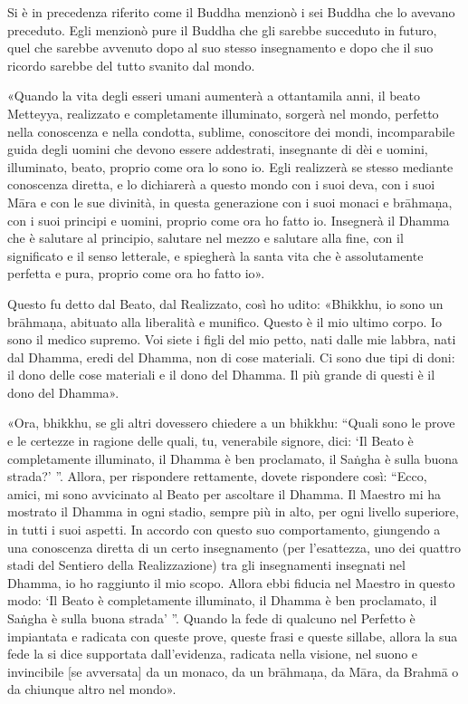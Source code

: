  Si è in precedenza riferito come il Buddha menzionò i
sei Buddha che lo avevano preceduto. Egli menzionò pure il Buddha che
gli sarebbe succeduto in futuro, quel che sarebbe avvenuto dopo al suo
stesso insegnamento e dopo che il suo ricordo sarebbe del tutto svanito
dal mondo.


 «Quando la vita degli esseri umani aumenterà a ottantamila
anni, il beato Metteyya, realizzato e completamente illuminato, sorgerà
nel mondo, perfetto nella conoscenza e nella condotta, sublime,
conoscitore dei mondi, incomparabile guida degli uomini che devono
essere addestrati, insegnante di dèi e uomini, illuminato, beato,
proprio come ora lo sono io. Egli realizzerà se stesso mediante
conoscenza diretta, e lo dichiarerà a questo mondo con i suoi deva, con
i suoi Māra e con le sue divinità, in questa generazione con i suoi
monaci e brāhmaṇa, con i suoi principi e uomini, proprio come ora ho
fatto io. Insegnerà il Dhamma che è salutare al principio, salutare nel
mezzo e salutare alla fine, con il significato e il senso letterale, e
spiegherà la santa vita che è assolutamente perfetta e pura, proprio
come ora ho fatto io».




Questo fu detto dal Beato, dal Realizzato, così ho udito: «Bhikkhu, io
sono un brāhmaṇa, abituato alla liberalità e munifico. Questo è il mio
ultimo corpo. Io sono il medico supremo. Voi siete i figli del mio
petto, nati dalle mie labbra, nati dal Dhamma, eredi del Dhamma, non di
cose materiali. Ci sono due tipi di doni: il dono delle cose materiali e
il dono del Dhamma. Il più grande di questi è il dono del Dhamma».




\label{pag222}«Ora, bhikkhu, se gli altri dovessero chiedere a un bhikkhu: “Quali sono
le prove e le certezze in ragione delle quali, tu, venerabile signore,
dici: ‘Il Beato è completamente illuminato, il Dhamma è ben proclamato,
il Saṅgha è sulla buona strada?’ ”. Allora, per rispondere rettamente,
dovete rispondere così: “Ecco, amici, mi sono avvicinato al Beato per
ascoltare il Dhamma. Il Maestro mi ha mostrato il Dhamma in ogni stadio,
sempre più in alto, per ogni livello superiore, in tutti i suoi aspetti.
In accordo con questo suo comportamento, giungendo a una conoscenza
diretta di un certo insegnamento (per l’esattezza, uno dei quattro stadi
del Sentiero della Realizzazione) tra gli insegnamenti insegnati nel
Dhamma, io ho raggiunto il mio scopo. Allora ebbi fiducia nel Maestro in
questo modo: ‘Il Beato è completamente illuminato, il Dhamma è ben
proclamato, il Saṅgha è sulla buona strada’ ”. Quando la fede di
qualcuno nel Perfetto è impiantata e radicata con queste prove, queste
frasi e queste sillabe, allora la sua fede la si dice supportata
dall’evidenza, radicata nella visione, nel suono e invincibile [se
avversata] da un monaco, da un brāhmaṇa, da Māra, da Brahmā o da
chiunque altro nel mondo».


